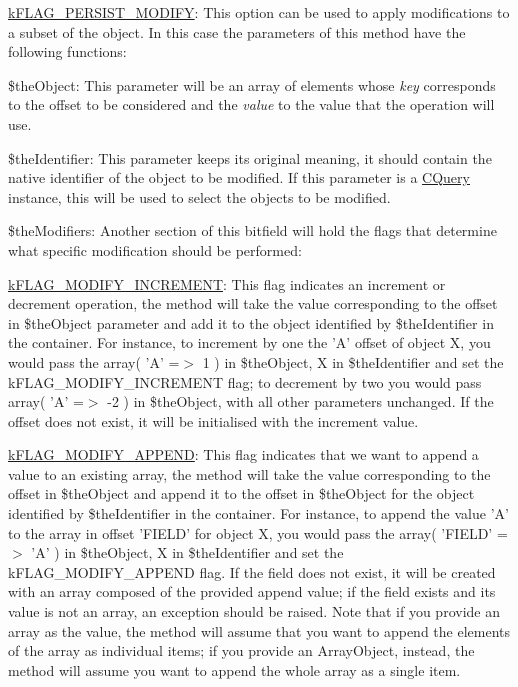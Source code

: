 \begin{DoxyItemize}
\begin{DoxyItemize}
\item \hyperlink{}{k\-F\-L\-A\-G\-\_\-\-P\-E\-R\-S\-I\-S\-T\-\_\-\-M\-O\-D\-I\-F\-Y}\-: This option can be used to apply modifications to a subset of the object. In this case the parameters of this method have the following functions\-: 
\begin{DoxyItemize}
\item {\ttfamily \$the\-Object}\-: This parameter will be an array of elements whose {\itshape key} corresponds to the offset to be considered and the {\itshape value} to the value that the operation will use. 
\item {\ttfamily \$the\-Identifier}\-: This parameter keeps its original meaning, it should contain the native identifier of the object to be modified. If this parameter is a \hyperlink{class_c_query}{C\-Query} instance, this will be used to select the objects to be modified. 
\item {\ttfamily \$the\-Modifiers}\-: Another section of this bitfield will hold the flags that determine what specific modification should be performed\-: 
\begin{DoxyItemize}
\item \hyperlink{}{k\-F\-L\-A\-G\-\_\-\-M\-O\-D\-I\-F\-Y\-\_\-\-I\-N\-C\-R\-E\-M\-E\-N\-T}\-: This flag indicates an increment or decrement operation, the method will take the value corresponding to the offset in {\ttfamily \$the\-Object} parameter and add it to the object identified by {\ttfamily \$the\-Identifier} in the container. For instance, to increment by one the '{\ttfamily A}' offset of object {\ttfamily X}, you would pass the {\ttfamily array( 'A' =$>$ 1 )} in {\ttfamily \$the\-Object}, {\ttfamily X} in {\ttfamily \$the\-Identifier} and set the k\-F\-L\-A\-G\-\_\-\-M\-O\-D\-I\-F\-Y\-\_\-\-I\-N\-C\-R\-E\-M\-E\-N\-T flag; to decrement by two you would pass {\ttfamily array( 'A' =$>$ -\/2 )} in {\ttfamily \$the\-Object}, with all other parameters unchanged. If the offset does not exist, it will be initialised with the increment value. 
\item \hyperlink{}{k\-F\-L\-A\-G\-\_\-\-M\-O\-D\-I\-F\-Y\-\_\-\-A\-P\-P\-E\-N\-D}\-: This flag indicates that we want to append a value to an existing array, the method will take the value corresponding to the offset in {\ttfamily \$the\-Object} and append it to the offset in {\ttfamily \$the\-Object} for the object identified by {\ttfamily \$the\-Identifier} in the container. For instance, to append the value '{\ttfamily A}' to the array in offset '{\ttfamily F\-I\-E\-L\-D}' for object {\ttfamily X}, you would pass the {\ttfamily array( 'F\-I\-E\-L\-D' =$>$ 'A' )} in {\ttfamily \$the\-Object}, {\ttfamily X} in {\ttfamily \$the\-Identifier} and set the k\-F\-L\-A\-G\-\_\-\-M\-O\-D\-I\-F\-Y\-\_\-\-A\-P\-P\-E\-N\-D flag. If the field does not exist, it will be created with an array composed of the provided append value; if the field exists and its value is not an array, an exception should be raised. Note that if you provide an array as the value, the method will assume that you want to append the elements of the array as individual items; if you provide an {\ttfamily Array\-Object}, instead, the method will assume you want to append the whole array as a single item. 

\end{DoxyItemize}
\end{DoxyItemize}
\end{DoxyItemize}
\end{DoxyItemize}
